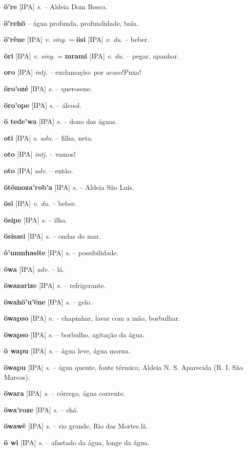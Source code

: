 \textbf{ö're} [IPA] \textit{s.} -- Aldeia Dom Bosco.

\textbf{ö'rehö} -- água profunda, profundidade, baía.

\textbf{ö'rẽne} [IPA] \textit{v. sing.} = \textbf{ösi} [IPA] \textit{v. du.} -- beber.

\textbf{öri} [IPA] \textit{v. sing.} = \textbf{mrami} [IPA] \textit{v. du.} -- pegar, apanhar.

\textbf{oro} [IPA] \textit{intj.} -- exclamação: por acaso!Puxa!

\textbf{öro'ozé} [IPA] \textit{s.} -- querosene.

\textbf{öro'ope} [IPA] \textit{s.} -- álcool.

\textbf{ö tede'wa} [IPA] \textit{s.} -- dono das águas.

\textbf{oti} [IPA] \textit{s. adu.} -- filha, neta.

\textbf{oto} [IPA] \textit{intj.} -- vamos!

\textbf{oto} [IPA] \textit{adv.} -- então.

\textbf{ötõmoza'rob'a} [IPA] \textit{s.} -- Aldeia São Luís.

\textbf{ösi} [IPA] \textit{v. du.} -- beber.

\textbf{ösipe} [IPA] \textit{s.} -- ilha.

\textbf{ösisasi} [IPA] \textit{s.} -- ondas do mar.

\textbf{õ'umnhasite} [IPA] \textit{s.} -- possibilidade.

\textbf{õwa} [IPA] \textit{adv.} -- lá.

\textbf{öwazarize} [IPA] \textit{s.} -- refrigerante.

\textbf{öwahö'u'ẽne} [IPA] \textit{s.} -- gelo.

\textbf{öwapso} [IPA] \textit{v.} -- chapinhar, lavar com a mão, borbulhar.

\textbf{öwapso} [IPA] \textit{s.} -- borbulho, agitação da água.

\textbf{ö wapu} [IPA] \textit{s.} -- água leve, água morna.

\textbf{öwapu} [IPA] \textit{s.} -- água quente, fonte térmica; Aldeia N. S. Aparecida (R. I. São Marcos).

\textbf{öwara} [IPA] \textit{s.} -- córrego, água corrente.

\textbf{öwa'roze} [IPA] \textit{s.} -- chá.

\textbf{öwawẽ} [IPA] \textit{s.} -- rio grande, Rio das Mortes.lã.

\textbf{ö wi} [IPA] \textit{s.} -- afastado da água, longe da água.

